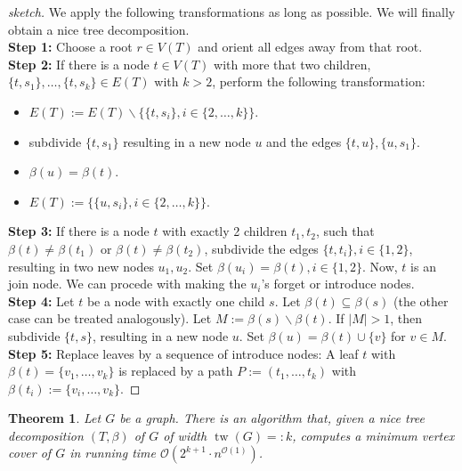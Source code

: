 \documentclass[11pt,a4paper]{article}
\newtheorem*{theorem}{Theorem}
\DeclareMathOperator{\tw}{tw}
\begin{document}
\begin{proof}[sketch]
We apply the following transformations as long as possible. We will finally obtain a nice tree decomposition. \\

\textbf{Step 1:} Choose a root $r \in V(T)$ and orient all edges away from that root. \\

\textbf{Step 2:} If there is a node $t \in V(T)$ with more that two children, $\{t, s_{1}\}, \dots, \{t, s_{k}\} \in E(T)$ with $k > 2$, perform the following transformation: \\

\begin{itemize}
\item $E(T) := E(T) \backslash \{\{t, s_{i}\}, i \in \{2, \dots, k\}\}$.
\item subdivide $\{t, s_{1}\}$ resulting in a new node $u$ and the edges $\{t, u\}, \{u, s_{1}\}$.
\item $\beta(u) = \beta(t)$.
\item $E(T) := \{\{u, s_{i}\}, i \in \{2, \dots, k\}\}$.
\end{itemize}

\textbf{Step 3:} If there is a node $t$ with exactly 2 children $t_{1}, t_{2}$, such that $\beta(t) \not = \beta(t_{1})$ or $\beta(t) \not = \beta(t_{2})$, subdivide the edges $\{t, t_{i}\}, i \in \{1,2\}$, resulting in two new nodes $u_{1}, u_{2}$. Set $\beta(u_{i}) = \beta(t), i \in \{1,2\}$. Now, $t$ is an join node. We can procede with making the $u_{i}$'s forget or introduce nodes. \\

\textbf{Step 4:} Let $t$ be a node with exactly one child $s$. Let $\beta(t) \subseteq \beta(s)$ (the other case can be treated analogously). Let $M := \beta(s) \backslash \beta(t)$. If $|M| > 1$, then subdivide $\{t, s\}$, resulting in a new node $u$. Set $\beta(u) = \beta(t) \cup \{v\}$ for $v \in M$. \\

\textbf{Step 5:} Replace leaves by a sequence of introduce nodes: A leaf $t$ with $\beta(t) = \{v_{1}, \dots, v_{k}\}$ is replaced by a path $P := (t_{1}, \dots, t_{k})$ with $\beta(t_{i}) := \{v_{i}, \dots, v_{k}\}$.
\end{proof}

\begin{theorem}
Let $G$ be a graph. There is an algorithm that, given a nice tree decomposition $(T, \beta)$ of $G$ of width $\tw(G) =: k$, computes a minimum vertex cover of $G$ in running time $\mathcal{O}(2^{k+1} \cdot n^{\mathcal{O}(1)})$.
\end{theorem}
\end{document}
